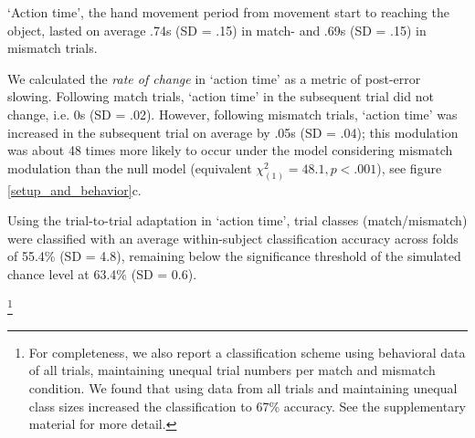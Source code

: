 `Action time', the hand movement period from movement start to reaching the object, lasted on average .74s (SD = .15) in match- and .69s (SD = .15) in mismatch trials. 


We calculated the \textit{rate of change} in `action time' as a metric of post-error slowing. Following match trials, `action time' in the subsequent trial did not change, i.e. 0s (SD = .02). However, following mismatch trials, `action time' was increased in the subsequent trial on average by .05s (SD = .04); this modulation was about 48 times more likely to occur under the model considering mismatch modulation than the null model (equivalent ${\chi}^2_{(1)} = 48.1, p<.001$), see figure \ref{setup_and_behavior}c. 


Using the trial-to-trial adaptation in `action time', trial classes (match/mismatch) were classified with an average within-subject classification accuracy across folds of 55.4\% (SD = 4.8), remaining below the significance threshold of the simulated chance level at 63.4\% (SD = 0.6).

\footnote{For completeness, we also report a classification scheme using behavioral data of all trials, maintaining unequal trial numbers per match and mismatch condition. We found that using data from all trials and maintaining unequal class sizes increased the classification to 67\% accuracy. See the supplementary material for more detail.}









